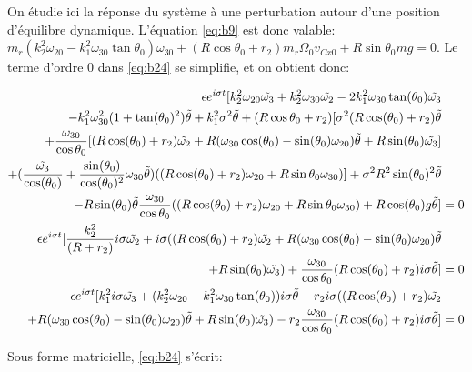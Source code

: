 On étudie ici la réponse du système à une perturbation autour d'une position d'équilibre dynamique. L'équation \ref{eq:b9} est donc valable: $m_r(k_2^2\omega_{20}-k_1^2\omega_{30} \tan{\theta_0})\omega_{30} +(R\cos{\theta_0}+r_2)m_r \Omega_0 v_{Cx0} + R\sin{\theta_0}mg =0$.
Le terme d'ordre 0 dans \ref{eq:b24} se simplifie, et on obtient donc:

\begin{align}
    \epsilon e^{i \sigma t} [k_2^2 \omega_{20} \tilde{\omega_3}+k_2^2 \omega_{30} \tilde{\omega_2} -2k_1^2\omega_{30} \tan(\theta_0)\tilde{\omega_3} & \nonumber \\
    -k_1^2 \omega_{30}^2(1+\tan(\theta_0)^2)\tilde{\theta} +k_1^2 \sigma^2 \tilde{\theta}+(R\cos{\theta_0}+r_2)[\sigma^2 ( R\cos(\theta_0)+r_2) \tilde{\theta} & \nonumber \\
    +\frac{\omega_{30}}{\cos{\theta_0}} [(R\cos(\theta_0)+r_2) \Tilde{\omega_2}+R(\omega_{30}\cos(\theta_0)-\sin(\theta_0)\omega_{20}) \Tilde{\theta}+R\sin(\theta_0) \Tilde{\omega_3} ] & \nonumber \\
    + (\frac{\tilde{\omega_3}}{\cos(\theta_0)}+\frac{\sin(\theta_0)}{\cos(\theta_0)^2}\omega_{30}\tilde{\theta})((R\cos(\theta_0)+r_2)\omega_{20}+R \sin{\theta_0}\omega_{30})]+ \sigma^2 R^2 \sin(\theta_0)^2  \tilde{\theta}& \nonumber \\
    -R\sin(\theta_0)\tilde{\theta}\frac{\omega_{30}}{\cos{\theta_0}}  ((R\cos(\theta_0)+r_2)\omega_{20}+R \sin{\theta_0}\omega_{30})+R\cos(\theta_0)g\tilde{\theta}] &=0 \nonumber\\ 
     \epsilon e^{i \sigma t}[\frac{k_2^2}{(R+r_2)} i \sigma \Tilde{\omega_2}+i \sigma((R\cos(\theta_0)+r_2) \Tilde{\omega_2} +R(\omega_{30}\cos(\theta_0)-\sin(\theta_0)\omega_{20}) \Tilde{\theta}& \nonumber \\
    +R\sin(\theta_0) \Tilde{\omega_3})+\frac{\omega_{30}}{\cos{\theta_0}} (R\cos(\theta_0)+r_2) i \sigma \tilde{\theta}]  &= 0
     \nonumber\\
    \epsilon e^{i \sigma t} [k_1^2 i \sigma\Tilde{\omega_3}+ (k_2^2\omega_{20}-k_1^2\omega_{30} \tan(\theta_0)) i \sigma \tilde{\theta} -r_2 i \sigma ((R\cos(\theta_0)+r_2) \Tilde{\omega_2} & \nonumber \\
    +R(\omega_{30}\cos(\theta_0)-\sin(\theta_0)\omega_{20}) \Tilde{\theta}+R\sin(\theta_0) \Tilde{\omega_3} )- r_2\frac{\omega_{30}}{\cos{\theta_0}} (R\cos(\theta_0)+r_2) i \sigma \tilde{\theta}] &= 0
  \label{eq:b24b}
\end{align}

Sous forme matricielle, \ref{eq:b24} s'écrit:

